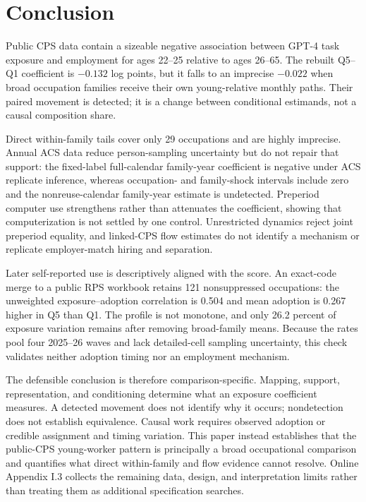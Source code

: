 \section{Conclusion}\label{sec:conclusion}

Public CPS data contain a sizeable negative association between GPT-4 task exposure and employment for ages 22--25 relative to ages 26--65.  The rebuilt Q5--Q1 coefficient is $-0.132$ log points, but it falls to an imprecise $-0.022$ when broad occupation families receive their own young-relative monthly paths.  Their paired movement is detected; it is a change between conditional estimands, not a causal composition share.

Direct within-family tails cover only 29 occupations and are highly imprecise.  Annual ACS data reduce person-sampling uncertainty but do not repair that support: the fixed-label full-calendar family-year coefficient is negative under ACS replicate inference, whereas occupation- and family-shock intervals include zero and the nonreuse-calendar family-year estimate is undetected.  Preperiod computer use strengthens rather than attenuates the coefficient, showing that computerization is not settled by one control.  Unrestricted dynamics reject joint preperiod equality, and linked-CPS flow estimates do not identify a mechanism or replicate employer-match hiring and separation.

Later self-reported use is descriptively aligned with the score.  An exact-code merge to a public RPS workbook retains 121 nonsuppressed occupations: the unweighted exposure--adoption correlation is 0.504 and mean adoption is 0.267 higher in Q5 than Q1.  The profile is not monotone, and only 26.2 percent of exposure variation remains after removing broad-family means.  Because the rates pool four 2025--26 waves and lack detailed-cell sampling uncertainty, this check validates neither adoption timing nor an employment mechanism.

The defensible conclusion is therefore comparison-specific.  Mapping, support, representation, and conditioning determine what an exposure coefficient measures.  A detected movement does not identify why it occurs; nondetection does not establish equivalence.  Causal work requires observed adoption or credible assignment and timing variation.  This paper instead establishes that the public-CPS young-worker pattern is principally a broad occupational comparison and quantifies what direct within-family and flow evidence cannot resolve.  Online Appendix I.3 collects the remaining data, design, and interpretation limits rather than treating them as additional specification searches.
